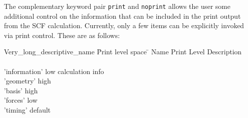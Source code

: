 


The complementary keyword pair \verb+print+ and \verb+noprint+ allows
the user some additional control on the information that can be
included in the print output from the SCF calculation.  Currently,
only a few items can be explicitly invoked via print control.  These
are as follows:
 

\begin{tabbing}
  Very\_long\_descriptive\_name \= Print level space \= \kill
  Name                   \> Print Level \> Description \\
                         \>        \> \\
        'information'   \>        low  \> calculation info\\
        'geometry'    \>          high \> \\
        'basis'        \>         high \> \\
        'forces'   \>             low \> \\
        'timing'   \>             default \> 
\end{tabbing}



